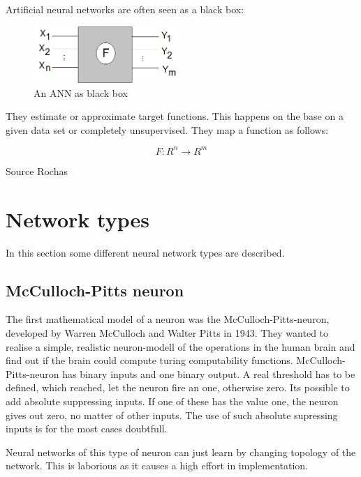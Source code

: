 \documentclass[10pt,a4paper,DIV=11]{scrreprt}
\begin{document}
Artificial neural networks are often seen as a black box: \\

\begin{center}
	\begin{figure}[H]
		\centering
		\includegraphics[width=0.5\textwidth,scale=1.0]{files/nn-bb.png}  
		\caption{An ANN as black box \cite{ROCHAS}}
		\label{fig:neuron}
	\end{figure}
\end{center} 
They estimate or approximate target functions. 
This happens on the base on a given data set or completely unsupervised.
They map a function as follows:

\begin{equation}
	F: R^n \to R^m
\end{equation} 





Source Rochas


\section{Network types}
In this section some different neural network types are described.

\subsection{McCulloch-Pitts neuron}
The first mathematical model of a neuron was the McCulloch-Pitts-neuron,
developed by Warren McCulloch and Walter Pitts in 1943.
They wanted to realise a simple, realistic neuron-modell of the operations in the human brain and find out if the brain could compute turing computability functions.
McCulloch-Pitts-neuron has binary inputs and one binary output.
A real threshold has to be defined, which reached, let the neuron fire an one, otherwise zero.
Its possible to add absolute suppressing inputs. If one of these has the value one, the neuron gives out zero, no matter of other inputs. The use of such absolute supressing inputs is for the most cases doubtfull.


Neural networks of this type of neuron can just learn by changing topology of the network. This is laborious as it causes a high effort in implementation.
\end{document}

